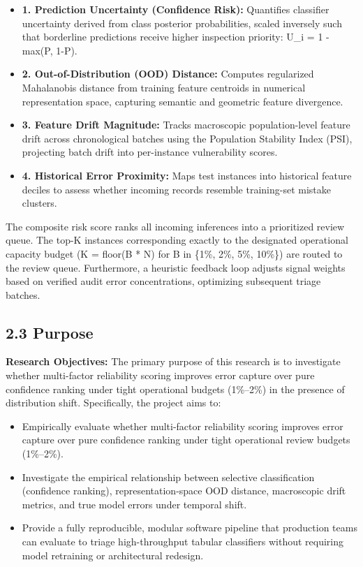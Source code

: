 \begin{itemize}
\item \textbf{1. Prediction Uncertainty (Confidence Risk):} Quantifies classifier uncertainty derived from class posterior probabilities, scaled inversely such that borderline predictions receive higher inspection priority: U\_i = 1 - max(P, 1-P).
\item \textbf{2. Out-of-Distribution (OOD) Distance:} Computes regularized Mahalanobis distance from training feature centroids in numerical representation space, capturing semantic and geometric feature divergence.
\item \textbf{3. Feature Drift Magnitude:} Tracks macroscopic population-level feature drift across chronological batches using the Population Stability Index (PSI), projecting batch drift into per-instance vulnerability scores.
\item \textbf{4. Historical Error Proximity:} Maps test instances into historical feature deciles to assess whether incoming records resemble training-set mistake clusters.
\end{itemize}

The composite risk score ranks all incoming inferences into a prioritized review queue. The top-K instances corresponding exactly to the designated operational capacity budget (K = floor(B * N) for B in \{1\%, 2\%, 5\%, 10\%\}) are routed to the review queue. Furthermore, a heuristic feedback loop adjusts signal weights based on verified audit error concentrations, optimizing subsequent triage batches.

\subsection{2.3 Purpose}

\textbf{Research Objectives:} The primary purpose of this research is to investigate whether multi-factor reliability scoring improves error capture over pure confidence ranking under tight operational budgets (1\%--2\%) in the presence of distribution shift. Specifically, the project aims to:

\begin{itemize}
\item Empirically evaluate whether multi-factor reliability scoring improves error capture over pure confidence ranking under tight operational review budgets (1\%--2\%).
\item Investigate the empirical relationship between selective classification (confidence ranking), representation-space OOD distance, macroscopic drift metrics, and true model errors under temporal shift.
\item Provide a fully reproducible, modular software pipeline that production teams can evaluate to triage high-throughput tabular classifiers without requiring model retraining or architectural redesign.
\end{itemize}

